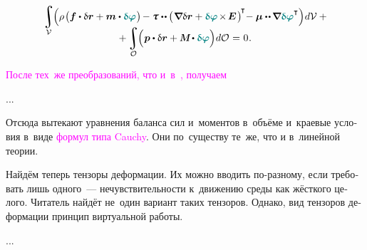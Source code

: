\begin{otherlanguage}{russian}
\nopagebreak\vspace{-0.3em}\begin{multline}
\integral\displaylimits_{\mathcal{V}} \hspace{-0.64ex}
\left(^{\mathstrut} \hspace{-0.1ex}
\rho \hspace{.2ex} \bigl(
\bm{f} \dotp \variation{\currentvector}
+ \bm{m} \dotp \littlerotationvector
\hspace{.1ex} \bigr) \hspace{-0.2ex}
- \forcestresstensor \dotdotp \hspace{-0.1ex} \bigl( \hspace{.16ex} \boldnabla \variation{\currentvector} + \littlerotationvector \hspace{-0.2ex} \times \hspace{-0.25ex} \bm{E} \hspace{.2ex} \bigr)^{\hspace{-0.25ex}\T} \hspace{-0.5ex}
- \couplestresstensor \dotdotp \hspace{-0.16ex} \boldnabla \littlerotationvector^{\T}
\right) \hspace{-0.3ex} d\mathcal{V}
\hspace{.5ex} + \\[-1.2em]
%
+ \integral\displaylimits_{\mathcal{O}} \hspace{-0.64ex}
\left(^{\mathstrut}
\bm{p} \dotp \variation{\currentvector}
+ \mathboldM \hspace{-0.1ex} \dotp \littlerotationvector
\right) \hspace{-0.3ex} d\mathcal{O} \hspace{.1ex}
= \hspace{.1ex} 0 \hspace{.1ex} .
\end{multline}

\textcolor{magenta}{После тех~же преобразований, что и~в~, получаем}

...

Отсюда вытекают уравнения баланса сил и~моментов в~объёме и~краевые условия в~виде \textcolor{magenta}{формул типа Cauchy}. Они по~существу те~же, что и в~линейной теории.

Найдём теперь тензоры деформации. Их можно вводить по\hbox{-}разному, если требовать лишь одного~--- нечувствительности к~движению среды как жёсткого целого. Читатель найдёт не~один вариант таких тензоров. Однако, вид тензоров деформации  принцип виртуальной работы.

...



\end{otherlanguage}

